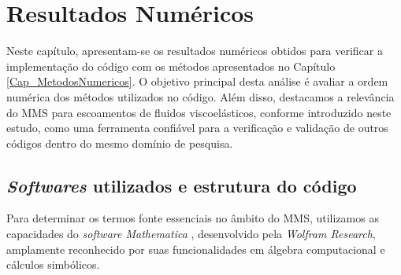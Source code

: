 \chapter[Resultados]{Resultados Numéricos}
\label{Cap_ResultadosNumericos}

Neste capítulo, apresentam-se os resultados numéricos obtidos para verificar a implementação do código com os métodos apresentados no Capítulo \ref{Cap_MetodosNumericos}. O objetivo principal desta análise é avaliar a ordem numérica dos métodos utilizados no código. Além disso, destacamos a relevância do MMS para escoamentos de fluidos viscoelásticos, conforme introduzido neste estudo, como uma ferramenta confiável para a verificação e validação de outros códigos dentro do mesmo domínio de pesquisa.

\section{\textit{Softwares} utilizados e estrutura do código}\label{sec_ResultadosNumericos_software}

Para determinar os termos fonte essenciais no âmbito do MMS, utilizamos as capacidades do \textit{software Mathematica} \cite{Mathematica}, desenvolvido pela \textit{Wolfram Research}, amplamente reconhecido por suas funcionalidades em álgebra computacional e cálculos simbólicos.

